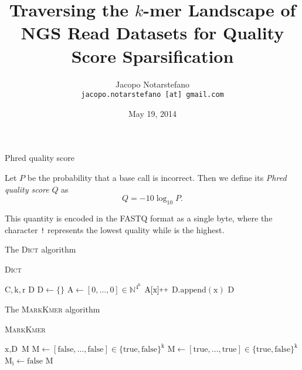 \documentclass[12pt]{beamer}
\title{Traversing the \(k\)-mer Landscape of NGS Read Datasets for Quality Score Sparsification}
\author[Jacopo Notarstefano]{
    Jacopo Notarstefano\\
    \texttt{jacopo.notarstefano [at] gmail.com}
}
\date{May 19, 2014}
\newcommand{\pp}{\nolinebreak\hspace{-.05em}\raisebox{.4ex}{\tiny\bf +}\nolinebreak\raisebox{.4ex}{\tiny\bf +}}
\newcommand{\textapprox}{\raisebox{0.5ex}{\texttildelow}}
\begin{document}
    \begin{frame}[plain]
        \titlepage
    \end{frame}

    \begin{frame}{}
    \end{frame}

    \begin{frame}{Phred quality score}
        \begin{definition}
            Let \(P\) be the probability that a base call is incorrect. Then we
	    define its \emph{Phred quality score} \(Q\) as
            \[
                Q = -10\log_{10}{P}\text{.}
	    \]
        \end{definition}
	\vspace{0.5cm}
	This quantity is encoded in the FASTQ format as a single byte, where the
	character \texttt{\textquotesingle!\textquotesingle} represents the
	lowest quality while \texttt{\textquotesingle\textapprox\textquotesingle}
	is the highest.
    \end{frame}

    \begin{frame}{The \textsc{Dict} algorithm}
        \begin{algorithm}[H]
	    \caption{\textsc{Dict}}
	    \begin{algorithmic}[1]
                \REQUIRE \(\text{C}, \text{k}, \text{r}\)
		\ENSURE \(\text{D}\)
		\STATE \(\text{D} \leftarrow \{\}\)
		\STATE \(\text{A} \leftarrow [0,\dots,0] \in \mathbb{N}^{4^\text{k}}\)
		    \STATE \(\text{A}[\text{x}]\pp\)
		\ENDFOR
		        \STATE \(\text{D}.\text{append}(\text{x})\)
		    \ENDIF
		\ENDFOR
		\RETURN \(\text{D}\)
	    \end{algorithmic}
	\end{algorithm}
    \end{frame}

    \begin{frame}{The \textsc{MarkKmer} algorithm}
        \begin{algorithm}[H]
	    \caption{\textsc{MarkKmer}}
	    \begin{algorithmic}[1]
		\REQUIRE \(\text{x}, \text{D}\)
		\ENSURE \(\text{M}\)
		    \STATE \(\text{M} \leftarrow [\text{false},\dots,\text{false}]\in\{\text{true},\text{false}\}^\text{k}\)
		\ELSE
		    \STATE \(\text{M} \leftarrow [\text{true},\dots,\text{true}]\in\{\text{true},\text{false}\}^\text{k}\)
			        \STATE \(\text{M}_\text{i}\leftarrow\text{false}\)
			    \ENDIF
			\ENDFOR
		    \ENDFOR
		\ENDIF
		\RETURN \(\text{M}\)
	    \end{algorithmic}
	\end{algorithm}
    \end{frame}
\end{document}
